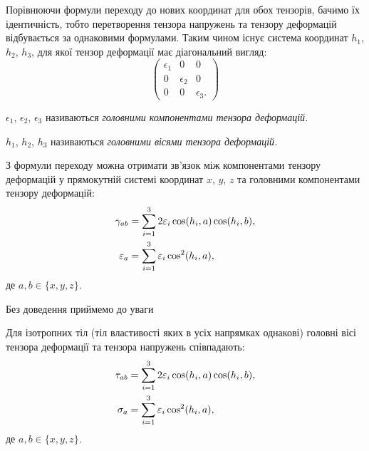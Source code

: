 % 


% 

% 



Порівнюючи формули переходу до нових координат для обох тензорів, бачимо їх ідентичність, тобто перетворення тензора напружень та тензору деформацій відбувається за однаковими формулами. Таким чином існує система координат $h_1$, $h_2$, $h_3$, для якої тензор деформації має діагональний вигляд: 
\begin{equation}
	\begin{pmatrix}
		\epsilon_1 & 0 & 0 \\
		0 & \epsilon_2 & 0 \\
		0 & 0 & \epsilon_3.
	\end{pmatrix}
\end{equation}

\begin{definition}
 	$\epsilon_1$, $\epsilon_2$, $\epsilon_3$ називаються \it{головними компонентами} тензора деформацій.
\end{definition} 

\begin{definition}
	$h_1$, $h_2$, $h_3$ називаються \it{головними вісями} тензора деформацій.
\end{definition}

З формули переходу можна отримати зв'язок між компонентами тензору деформацій у прямокутній системі координат $x$, $y$, $z$ та головними компонентами тензору деформацій:
\begin{align}
	\gamma_{a b} &= \displaystyle\sum\limits_{i = 1}^3 2 \varepsilon_i \cos (h_i, a) \cos (h_i, b), \\
	\varepsilon_a &= \displaystyle\sum\limits_{i = 1}^3 \varepsilon_i \cos^2(h_i, a),
\end{align}
де $a, b \in \{x, y, z\}$. \medskip

Без доведення приймемо до уваги 

\begin{proposition}
	Для ізотропних тіл (тіл властивості яких в усіх напрямках однакові) головні вісі тензора деформації та тензора напружень співпадають:
	\begin{align}
		\tau_{a b} &= \displaystyle\sum\limits_{i = 1}^3 2 \varepsilon_i \cos (h_i, a) \cos (h_i, b), \\
		\sigma_a &= \displaystyle\sum\limits_{i = 1}^3 \varepsilon_i \cos^2(h_i, a),
	\end{align}
	де $a, b \in \{x, y, z\}$.
\end{proposition}

